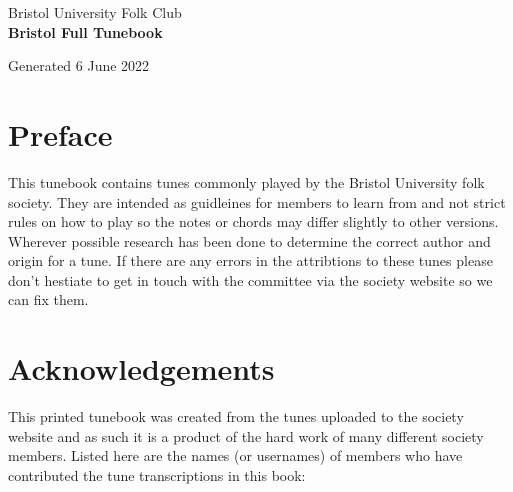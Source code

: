 \documentclass[12pt,a4paper,twoside]{article}
\makeatletter
\newcommand{\thetitle}{Bristol Full Tunebook}
\newcommand{\thedate}{6 June 2022}
\renewcommand\tableofcontents{%
    \begin{multicols}{2}[
      \centering
      \section*{\large\contentsname
        \@mkboth{%
           \MakeUppercase\contentsname}{\MakeUppercase\contentsname}}]
    \@starttoc{toc}%
    \end{multicols}
}
\makeatother
\begin{document}
\begin{titlepage}
   \begin{center}
       \large Bristol University Folk Club \\

       \vspace{4cm}
       \textbf{\Huge \thetitle}

       \vspace{0.5cm}
       Generated \thedate

       \vspace{1.5cm}

       \vfill

   \end{center}
\end{titlepage}

\tableofcontents

\section{Preface}

This tunebook contains tunes commonly played by the Bristol University folk society. They are intended as guidleines for members to learn from and not strict rules on how to play so the notes or chords may differ slightly to other versions.
Wherever possible research has been done to determine the correct author and origin for a tune. If there are any errors in the attribtions to these tunes please don't hestiate to get in touch with the committee via the society website so we can fix them.

\section{Acknowledgements}

This printed tunebook was created from the tunes uploaded to the society website and as such it is a product of the hard work of many different society members. Listed here are the names (or usernames) of members who have contributed the tune transcriptions in this book:
\end{document}

